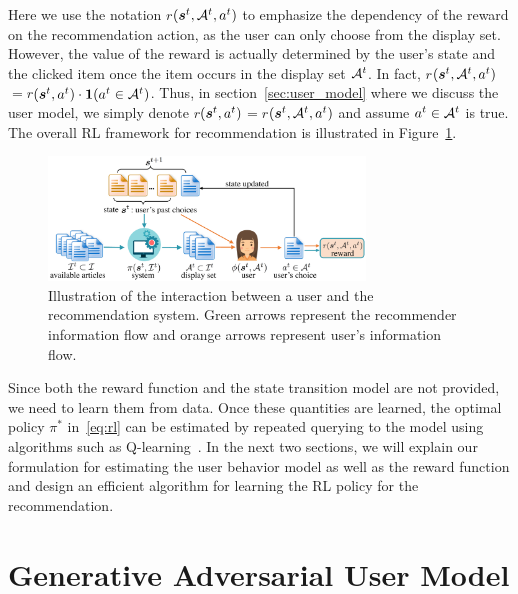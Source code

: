 \documentclass{article} %
\begin{document}
Here we use the notation $r${\small$({\bm{s}}^t, {\mathcal{A}}^t, a^t)$} to emphasize the dependency of the reward on the recommendation action, as the user can only choose from the display set. However, the value of the reward is actually determined by the user's state and the clicked item once the item occurs in the display set {\small${\mathcal{A}}^t$}. In fact, $r${\small$({\bm{s}}^t, {\mathcal{A}}^t, a^t) $}$=r${\small$({\bm{s}}^t, a^t)\cdot \bm{1}(a^t\in {\mathcal{A}}^t) $}. Thus, in section~\ref{sec:user_model} where we discuss the user model, we simply denote $r${\small$({\bm{s}}^t, a^t)$}$=r${\small$({\bm{s}}^t, {\mathcal{A}}^t, a^t)$} and assume {\small$a^t\in {\mathcal{A}}^t$} is true. The overall RL framework for recommendation is illustrated in Figure~\ref{fig:overall_framework}. 

\begin{figure}[h]
    \vspace{-4mm}
    \centering
    \includegraphics[width=0.75\textwidth]{overallfigure.pdf}
    \vspace{-3mm}
    \caption{{\small Illustration of the interaction between a user and the recommendation system. Green arrows represent the recommender information flow and orange arrows represent user's information flow.}}
    \label{fig:overall_framework}
    \vspace{-3mm}
\end{figure}{}

Since both the reward function and the state transition model are not provided, we need to learn them from data. Once these quantities are learned, the optimal policy $\pi^\ast$ in~\eqref{eq:rl} can be estimated by repeated querying to the model using algorithms such as Q-learning~\citep{Watkins89}. In the next two sections, we will explain our formulation for estimating the user behavior model as well as the reward function and design an efficient algorithm for learning the RL policy for the recommendation. 


\vspace{-3mm}
\section{Generative Adversarial User Model}
\vspace{-3mm}
\end{document}
